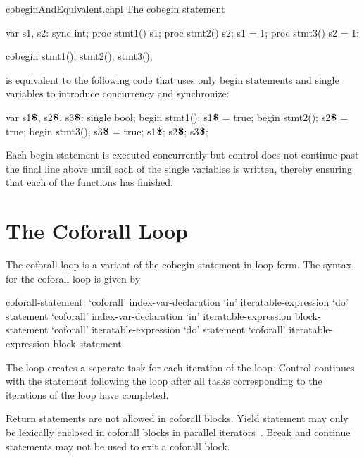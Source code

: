 \begin{chapelexample}{cobeginAndEquivalent.chpl}
The cobegin statement
\begin{chapelpre}
var s1, s2: sync int;
proc stmt1() { s1; }
proc stmt2() { s2; s1 = 1; }
proc stmt3() { s2 = 1; }
\end{chapelpre}
\begin{chapel}
cobegin {
  stmt1();
  stmt2();
  stmt3();
}
\end{chapel}
is equivalent to the following code that uses only begin statements
and single variables to introduce concurrency and synchronize:
\begin{chapel}
var s1$\mbox{{\bf \$}}$, s2$\mbox{{\bf \$}}$, s3$\mbox{{\bf \$}}$: single bool;
begin { stmt1(); s1$\mbox{{\bf \$}}$ = true; }
begin { stmt2(); s2$\mbox{{\bf \$}}$ = true; }
begin { stmt3(); s3$\mbox{{\bf \$}}$ = true; }
s1$\mbox{{\bf \$}}$; s2$\mbox{{\bf \$}}$; s3$\mbox{{\bf \$}}$;
\end{chapel}
\begin{chapeloutput}
\end{chapeloutput}
Each begin statement is executed concurrently but control does not
continue past the final line above until each of the single variables
is written, thereby ensuring that each of the functions has finished.
\end{chapelexample}

\section{The Coforall Loop}
\label{Coforall}

The coforall loop is a variant of the cobegin statement in loop form.
The syntax for the coforall loop is given by
\begin{syntax}
coforall-statement:
  `coforall' index-var-declaration `in' iteratable-expression `do' statement
  `coforall' index-var-declaration `in' iteratable-expression block-statement
  `coforall' iteratable-expression `do' statement
  `coforall' iteratable-expression block-statement
\end{syntax}

The  loop creates a separate task for each iteration of
the loop.  Control continues with the statement following
the  loop after all tasks corresponding to the
iterations of the loop have completed.

Return statements are not allowed in coforall blocks.  Yield statement
may only be lexically enclosed in coforall blocks in parallel
iterators~.  Break and continue statements
may not be used to exit a coforall block.

